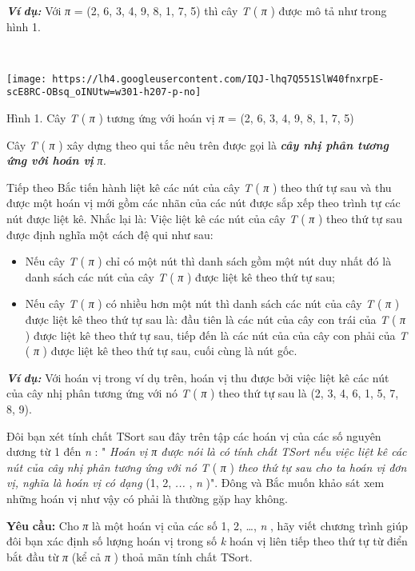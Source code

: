 \textbf{\emph{Ví }}\textbf{\emph{ dụ: }} Với \emph{ π } = (2, 6, 3, 4, 9, 8, 1, 7, 5) thì cây \emph{ T } ( \emph{ π } ) được mô tả như trong hình 1.

 


\texttt{[image: https://lh4.googleusercontent.com/IQJ-lhq7Q551SlW40fnxrpE-scE8RC-OBsq\_oINUtw=w301-h207-p-no]}

Hình 1. Cây \emph{ T } ( \emph{ π } ) tương ứng với hoán vị \emph{ π } = (2, 6, 3, 4, 9, 8, 1, 7, 5)

Cây \emph{ T } ( \emph{ π } ) xây dựng theo qui tắc nêu trên được gọi là \textbf{\emph{ cây nhị phân tương ứng với hoán vị }}\emph{ π. }

Tiếp theo Bắc tiến hành liệt kê các nút của cây \emph{ T } ( \emph{ π } ) theo thứ tự sau và thu được một hoán vị mới gồm các nhãn của các nút được sắp xếp theo trình tự các nút được liệt kê. Nhắc lại là: Việc liệt kê các nút của cây \emph{ T } ( \emph{ π } ) theo thứ tự sau được định nghĩa một cách đệ qui như sau:
\begin{itemize}
	\item Nếu cây \emph{ T } ( \emph{ π } ) chỉ có một nút thì danh sách gồm một nút duy nhất đó là danh sách các nút của cây \emph{ T } ( \emph{ π } ) được liệt kê theo thứ tự sau;
	\item Nếu cây \emph{ T } ( \emph{ π } ) có nhiều hơn một nút thì danh sách các nút của cây \emph{ T } ( \emph{ π } ) được liệt kê theo thứ tự sau là: đầu tiên là các nút của cây con trái của \emph{ T } ( \emph{ π } ) được liệt kê theo thứ tự sau, tiếp đến là các nút của của cây con phải của \emph{ T } ( \emph{ π } ) được liệt kê theo thứ tự sau, cuối cùng là nút gốc.
\end{itemize}

\textbf{\emph{Ví }}\textbf{\emph{}}\textbf{\emph{ dụ: }} Với hoán vị trong ví dụ trên, hoán vị thu được bởi việc liệt kê các nút của cây nhị phân tương ứng với nó \emph{ T } ( \emph{ π } ) theo thứ tự sau là (2, 3, 4, 6, 1, 5, 7, 8, 9).

Đôi bạn xét tính chất TSort sau đây trên tập các hoán vị của các số nguyên dương từ 1 đến \emph{ n } : " \emph{ Hoán }\emph{ vị π được nói là có tính chất TSort nếu việc liệt kê các nút của cây nhị phân tương ứng với nó T } ( \emph{ π } ) \emph{ theo thứ tự sau cho ta hoán vị đơn vị, nghĩa là hoán vị có dạng } (1, 2, \emph{ ... } , \emph{ n } )". Đông và Bắc muốn khảo sát xem những hoán vị như vậy có phải là thường gặp hay không.

\textbf{Yêu }\textbf{}\textbf{ cầu: }\textbf{} Cho \emph{ π } là một hoán vị của các số 1, 2, …, \emph{ n } , hãy viết chương trình giúp đôi bạn xác định số lượng hoán vị trong số \emph{ k } hoán vị liên tiếp theo thứ tự từ điển bắt đầu từ \emph{ π } (kể cả \emph{ π } ) thoả mãn tính chất TSort.

